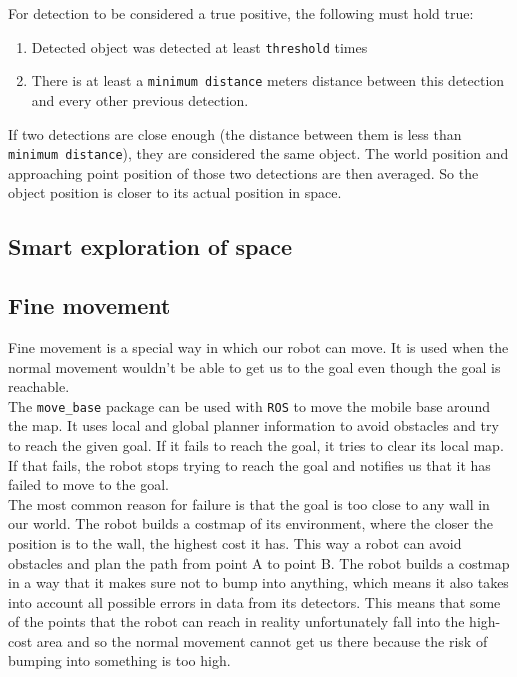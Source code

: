 \documentclass[12pt,a4paper]{article}
\begin{document}
	For detection to be considered a true positive, the following must hold true:
	\begin{enumerate}
		\item Detected object was detected at least \texttt{threshold} times
		\item There is at least a \texttt{minimum distance} meters distance between this detection and every other previous detection.
	\end{enumerate}

	If two detections are close enough (the distance between them is less than \texttt{minimum distance}), they are considered the same object. The world position and approaching point position of those two detections are then averaged. So the object position is closer to its actual position in space.
	
	\subsection{Smart exploration of space} \label{smart_exploration}
	
	\subsection{Fine movement} \label{fine_movement}
	Fine movement is a special way in which our robot can move. It is used when the normal movement wouldn't be able to get us to the goal even though the goal is reachable.  \\

	The \texttt{move\_base} package can be used with \texttt{ROS} to move the mobile base around the map. It uses local and global planner information to avoid obstacles and try to reach the given goal. If it fails to reach the goal, it tries to clear its local map. If that fails, the robot stops trying to reach the goal and notifies us that it has failed to move to the goal. \\
	
	The most common reason for failure is that the goal is too close to any wall in our world. The robot builds a costmap of its environment, where the closer the position is to the wall, the highest cost it has. This way a robot can avoid obstacles and plan the path from point A to point B. The robot builds a costmap in a way that it makes sure not to bump into anything, which means it also takes into account all possible errors in data from its detectors. This means that some of the points that the robot can reach in reality unfortunately fall into the high-cost area and so the normal movement cannot get us there because the risk of bumping into something is too high. \\
\end{document}
